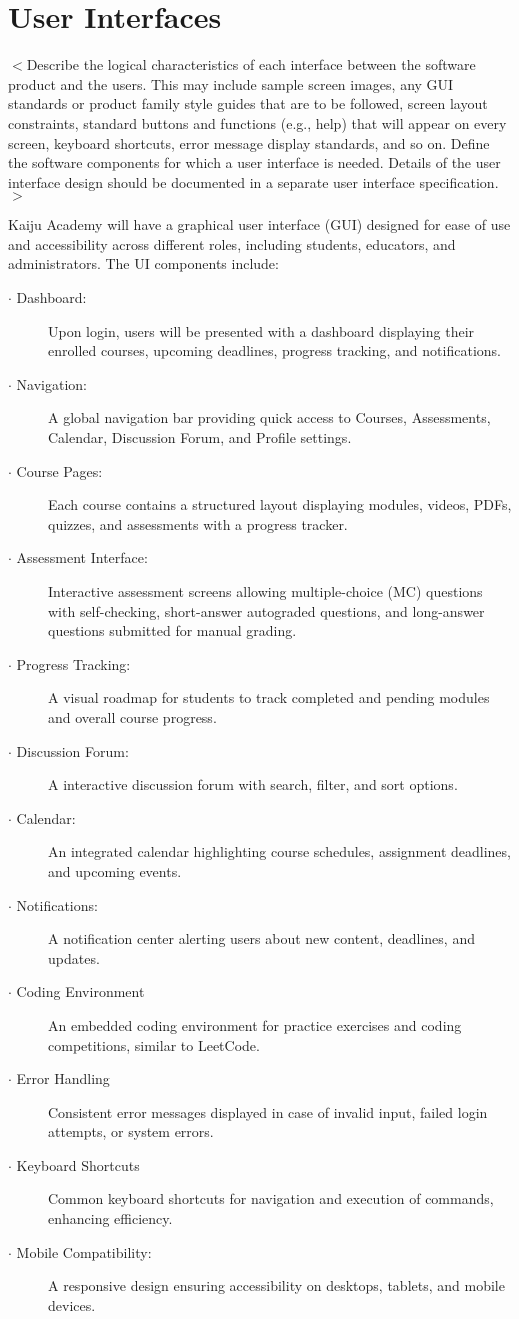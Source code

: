\documentclass[a4paper, 11pt]{scrreprt}
\begin{document}
\section{User Interfaces}
$<$Describe the logical characteristics of each interface between the software 
product and the users. This may include sample screen images, any GUI standards 
or product family style guides that are to be followed, screen layout 
constraints, standard buttons and functions (e.g., help) that will appear on 
every screen, keyboard shortcuts, error message display standards, and so on.  
Define the software components for which a user interface is needed. Details of 
the user interface design should be documented in a separate user interface 
specification.$>$

Kaiju Academy will have a graphical user interface (GUI) designed for ease of use and accessibility across different roles, including students, educators, and administrators. The UI components include:
\begin{description}
    \item[$\cdot$ Dashboard:] Upon login, users will be presented with a dashboard displaying their enrolled courses, upcoming deadlines, progress tracking, and notifications.
    \item[$\cdot$ Navigation:] A global navigation bar providing quick access to Courses, Assessments, Calendar, Discussion Forum, and Profile settings.
    \item[$\cdot$ Course Pages:] Each course contains a structured layout displaying modules, videos, PDFs, quizzes, and assessments with a progress tracker.
    \item[$\cdot$ Assessment Interface:] Interactive assessment screens allowing multiple-choice (MC) questions with self-checking, short-answer autograded questions, and long-answer questions submitted for manual grading.
    \item[$\cdot$ Progress Tracking:] A visual roadmap for students to track completed and pending modules and overall course progress.
    \item[$\cdot$ Discussion Forum:] A interactive discussion forum with search, filter, and sort options.
    \item[$\cdot$ Calendar:] An integrated calendar highlighting course schedules, assignment deadlines, and upcoming events.
    \item[$\cdot$ Notifications:] A notification center alerting users about new content, deadlines, and updates.
    \item[$\cdot$ Coding Environment] An embedded coding environment for practice exercises and coding competitions, similar to LeetCode.
    \item[$\cdot$ Error Handling] Consistent error messages displayed in case of invalid input, failed login attempts, or system errors.
    \item[$\cdot$ Keyboard Shortcuts] Common keyboard shortcuts for navigation and execution of commands, enhancing efficiency.
    \item[$\cdot$ Mobile Compatibility:] A responsive design ensuring accessibility on desktops, tablets, and mobile devices.
\end{description}
\end{document}
